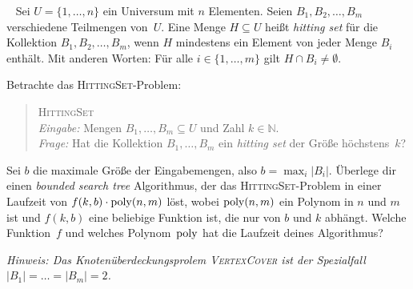 \documentclass{uebung_cs}
\begin{document}
\begin{exercise}\
	Sei $U = \{1,\dots,n\}$ ein Universum mit $n$ Elementen.
	Seien $B_1,B_2,\dots,B_m$ verschiedene Teilmengen von~$U$.
	Eine Menge $H \subseteq U$ heißt \emph{hitting set} für die Kollektion $B_1,B_2,\dots,B_m$, wenn $H$ mindestens ein Element von jeder Menge $B_i$ enthält. Mit anderen Worten: Für alle $i \in \{1,\dots,m\}$ gilt $H \cap B_i \neq \emptyset$.

	Betrachte das \textsc{HittingSet}-Problem:
	\begin{quote}
		\textsc{HittingSet}\\
		\emph{Eingabe:} Mengen $B_1,\dots,B_m\subseteq U$ und Zahl $k\in \mathbb N$.\\
		\emph{Frage:} Hat die Kollektion $B_1,\dots,B_m$ ein \textit{hitting set} der Größe höchstens~$k$?
	\end{quote}

	Sei $b$ die maximale Größe der Eingabemengen, also $b=\max_i|B_i|$.
	Überlege dir einen \textit{bounded search tree} Algorithmus, der das \textsc{HittingSet}-Problem in einer Laufzeit von $f(k,b) \cdot \operatorname{poly}(n,m)$ löst, wobei $\operatorname{poly}(n,m)$ ein Polynom in $n$ und $m$ ist und $f(k,b)$ eine beliebige Funktion ist, die nur von $b$ und $k$ abhängt.
	Welche Funktion~$f$ und welches Polynom~$\operatorname{poly}$ hat die Laufzeit deines Algorithmus?

	\textit{Hinweis: Das Knotenüberdeckungsprolem \textsc{\upshape VertexCover} ist der Spezialfall $|B_1|=\dots=|B_m|=2$.}
\end{exercise}
\end{document}
